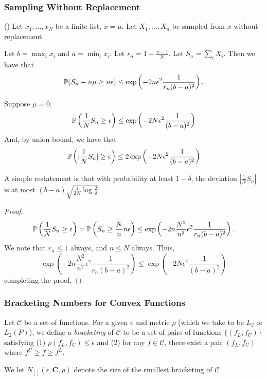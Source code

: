 \subsubsection{Sampling Without Replacement}

\begin{lemma} (\cite{serfling1974probability}) 
Let $x_1,..., x_N$ be a finite list, $\bar{x} = \mu$. Let $X_1,...,X_n$ be sampled from $x$ without replacement. 

Let $b = \max_i x_i$ and $a = \min_i x_i$. Let $r_n = 1- \frac{n-1}{N}$. Let $S_n = \sum_i X_i$.
Then we have that
\[
\P( S_n - n \mu \geq n \epsilon) \leq \exp\left( - 2 n \epsilon^2 \frac{1}{r_n (b-a)^2}\right).
\]
\end{lemma}

\begin{corollary}
\label{cor:serfling}
Suppose $\mu = 0$. 
\[
\P\left( \frac{1}{N} S_n \geq \epsilon\right) \leq \exp\left( -2 N \epsilon^2 \frac{1}{(b-a)^2}\right)
\]
And, by union bound, we have that
\[
\P\left( | \frac{1}{N} S_n| \geq \epsilon\right) \leq 2 \exp\left( -2 N \epsilon^2 \frac{1}{(b-a)^2}\right)
\]

\end{corollary}

A simple restatement is that with probability at least $1- \delta$, the deviation $| \frac{1}{N} S_n|$ is at most $ (b-a) \sqrt{ \frac{1}{2N} \log \frac{2}{\delta}}$.

\begin{proof}
\[
\P\left( \frac{1}{N} S_n \geq \epsilon\right) = \P\left( S_n \geq \frac{N}{n} n \epsilon\right) \leq \exp\left( - 2 n \frac{N^2}{n^2} \epsilon^2 \frac{1}{r_n (b-a)^2} \right).
\]
We note that $r_n \leq 1$ always, and $n \leq N$ always.   Thus,
\[
\exp\left( - 2 n \frac{N^2}{n^2} \epsilon^2 \frac{1}{r_n (b-a)^2} \right)  \leq \exp\left( - 2 N \epsilon^2 \frac{1}{(b-a)^2}\right)
\]
completing the proof.
\end{proof}

\subsubsection{Bracketing Numbers for Convex Functions}

\begin{definition}
Let $\mathcal{C}$ be a set of functions. For a given $\epsilon$ and metric $\rho$ (which we take to be $L_2$ or $L_2(P)$), we define a \textit{bracketing} of $\mathcal{C}$ to be a set of pairs of functions $\{ (f_L, f_U) \}$ satisfying (1) $\rho( f_L, f_U) \leq \epsilon$ and (2) for any $f \in \mathcal{C}$, there exist a pair $(f_L, f_U)$ where $f^U \geq f \geq f^L$. 

We let $N_{[]}(\epsilon, \mathbf{C}, \rho)$ denote the size of the smallest bracketing of $\mathcal{C}$
\end{definition}

